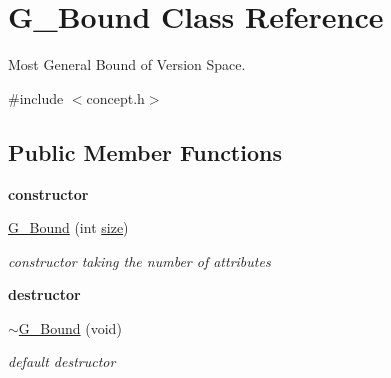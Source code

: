 \hypertarget{class_g___bound}{\section{G\-\_\-\-Bound Class Reference}
\label{class_g___bound}
}


Most General Bound of Version Space.  




{\ttfamily \#include $<$concept.\-h$>$}

\subsection*{Public Member Functions}
\begin{Indent}{\bf constructor}\par
\begin{DoxyCompactItemize}
\item 
\hyperlink{class_g___bound_af622a6a9136c180b19b038bdb2e5207c}{G\-\_\-\-Bound} (int \hyperlink{class_g___bound_a2583e4243c89d01b3131ce8fb40940a9}{size})
\begin{DoxyCompactList}\small\item\em constructor taking the number of attributes \end{DoxyCompactList}\end{DoxyCompactItemize}
\end{Indent}
\begin{Indent}{\bf destructor}\par
\begin{DoxyCompactItemize}
\item 
\hyperlink{class_g___bound_a38ff1d10b4fce5df85429f8196a36964}{$\sim$\-G\-\_\-\-Bound} (void)
\begin{DoxyCompactList}\small\item\em default destructor \end{DoxyCompactList}\end{DoxyCompactItemize}
\end{Indent}
